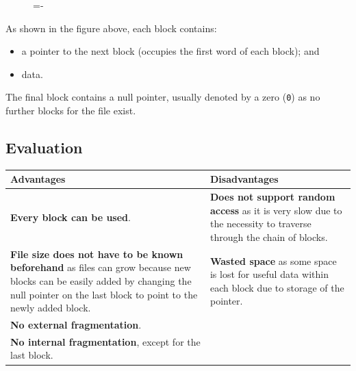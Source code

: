 \documentclass[a4paper]{systems-software}
\begin{document}
\begin{figure}[H]
  \lineskip=-\fboxrule
\end{figure}

As shown in the figure above, each block contains:
\begin{itemize}
	\item a pointer to the next block (occupies the first word of each block); and
	\item data.
\end{itemize}

The final block contains a null pointer, usually denoted by a zero (\texttt{0}) as no further blocks for the file exist.


\subsection*{Evaluation}

\begin{longtabu} to \textwidth {| X[1,l] | X[1,l] |}
    \hline
    \textbf{Advantages} & \textbf{Disadvantages}
	\\ \hline
	\textbf{Every block can be used}. &
	\textbf{Does not support random access} as it is very slow due to the necessity to traverse through the chain of blocks.
	\\ \hline
	\textbf{File size does not have to be known beforehand} as files can grow because new blocks can be easily added by changing the null pointer on the last block to point to the newly added block. &
	\textbf{Wasted space} as some space is lost for useful data within each block due to storage of the pointer.
	\\ \hline
	\textbf{No external fragmentation}. &
	\\ \hline
	\textbf{No internal fragmentation}, except for the last block. &
	\\ \hline
\end{longtabu}
\end{document}
